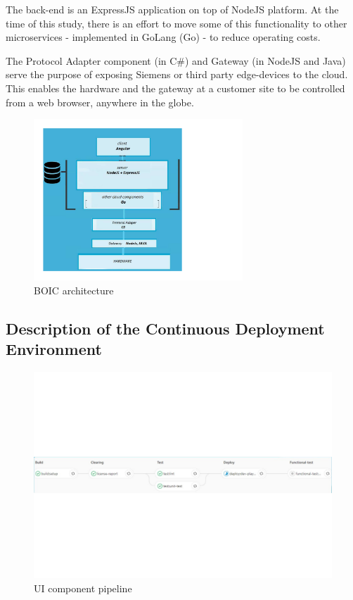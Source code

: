\documentclass[conference]{IEEEtran}
\begin{document}
	The back-end is an ExpressJS application on top of NodeJS platform. 
	At the time of this study, there is an effort to move some of this functionality to other microservices - implemented in GoLang (Go) - to reduce operating costs.
	
	The Protocol Adapter component (in C\#) and Gateway (in NodeJS and Java) serve the purpose of exposing Siemens or third party edge-devices to the cloud. 
	This enables the hardware and the gateway at a customer site to be controlled from a web browser, anywhere in the globe.

\begin{figure}[!h]
		\includegraphics[width=0.70\textwidth,]{architecture.pdf}
	\caption{BOIC architecture}
	\label{fig:BOIC architecture}
\end{figure}

	\subsection{Description of the Continuous Deployment Environment }
	
	\begin{figure}[!t]
		\centering
			\includegraphics[width=1.00\textwidth]{UIpipeline.pdf}
		\caption{UI component pipeline}
		\label{fig:UIpipeline}
	\end{figure}
	
\end{document}
